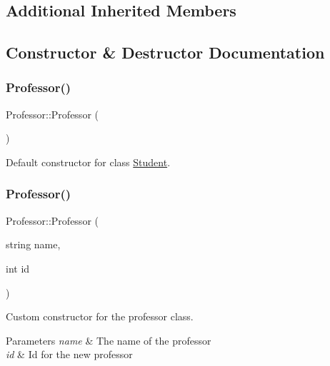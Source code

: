 \subsection*{Additional Inherited Members}


\subsection{Constructor \& Destructor Documentation}
\mbox{\label{class_professor_ac6d4e54caf399a841888e60b54eed4c3}} 
\subsubsection{\texorpdfstring{Professor()}{Professor()}\hspace{0.1cm}{\footnotesize\ttfamily [1/2]}}
{\footnotesize\ttfamily Professor\+::\+Professor (\begin{DoxyParamCaption}{ }\end{DoxyParamCaption})}



Default constructor for class \hyperlink{class_student}{Student}. 

\mbox{\label{class_professor_ac264bd1b8657897edf63ecb535315ab7}} 
\subsubsection{\texorpdfstring{Professor()}{Professor()}\hspace{0.1cm}{\footnotesize\ttfamily [2/2]}}
{\footnotesize\ttfamily Professor\+::\+Professor (\begin{DoxyParamCaption}\item[{string}]{name,  }\item[{int}]{id }\end{DoxyParamCaption})}



Custom constructor for the professor class. 


\begin{DoxyParams}{Parameters}
{\em name} & The name of the professor \\
\hline
{\em id} & Id for the new professor \\
\hline
\end{DoxyParams}
\mbox{\label{class_professor_ac3b5cfd3e0016f25f4c2c194ccd593d8}} 
